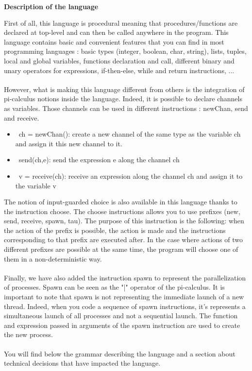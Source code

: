 \documentclass[11pt]{report}
\begin{document}
\newpage
\centerline{\textbf{\Huge Description of the language}}
\vspace*{3pt}
\vspace*{20pt}
\tabto{1cm}First of all, this language is procedural meaning that procedures/functions are declared at top-level and can then be called anywhere in the program. This language contains basic and convenient features that you can find in most programming languages : basic types (integer, boolean, char, string), lists, 
tuples, local and global variables, functions declaration and call, different binary and unary operators for expressions, if-then-else, while and return instructions, ...
\\ \\
\tabto{1cm}However, what is making this language different from others is the integration of pi-calculus notions inside the language. Indeed, it is possible to declare channels as variables. Those channels can be used in different instructions : newChan, send and receive.
\begin{itemize}
\item \ ch = newChan(): create a new channel of the same type as the variable ch and assign it this new channel to it.
\item \ send(ch,e): send the expression e along the channel ch
\item \ v = receive(ch): receive an expression along the channel ch and assign it to the variable v
\end{itemize}

\tabto{1cm}The notion of input-guarded choice is also available in this language thanks to the instruction choose. The choose instructions allows you to use prefixes (new, send, receive, spawn, tau). The purpose of this instruction is the following: when the action of the prefix is possible, the action is made and the instructions corresponding to that prefix are executed after. In the case where actions of two different prefixes are possible at the same time, the program will choose one of them in a non-deterministic way.
\\ \\
\tabto{1cm} Finally, we have also added the instruction spawn to represent the parallelization of processes. Spawn can be seen as the "|" operator of the pi-calculus. It is important to note that spawn is not representing the immediate launch of a new thread. Indeed, when you code a sequence of spawn instructions, it's represents a simultaneous launch of all processes and not a sequential launch. The function and expression passed in arguments of the spawn instruction are used to create the new process.
\\ \\
\tabto{1cm} You will find below the grammar describing the language and a section about technical decisions that have impacted the language.
\end{document}

